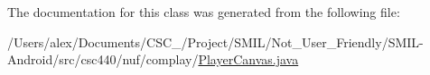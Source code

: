 The documentation for this class was generated from the following file\-:\begin{DoxyCompactItemize}
\item 
/\-Users/alex/\-Documents/\-C\-S\-C\-\_/\-Project/\-S\-M\-I\-L/\-Not\-\_\-\-User\-\_\-\-Friendly/\-S\-M\-I\-L-\/\-Android/src/csc440/nuf/complay/\hyperlink{_player_canvas_8java}{Player\-Canvas.\-java}\end{DoxyCompactItemize}
